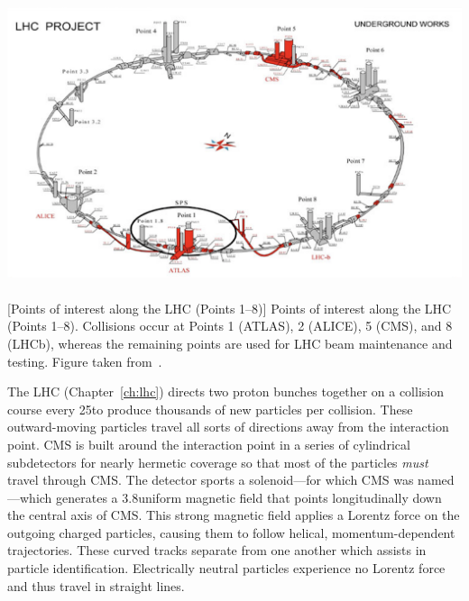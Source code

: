 \begin{multiFigure}
    \centering
    \includegraphics[height=9cm,keepaspectratio]{figures/cms/lhc_points_with_buildings.png}
        [Points of interest along the LHC (Points 1--8)]
        {Points of interest along the LHC (Points 1--8).
        Collisions occur at Points 1 (ATLAS), 2 (ALICE), 5 (CMS), and 8 (LHCb), whereas the remaining points are used for LHC beam maintenance and testing.
        Figure taken from~\cite{PhysRevLett.114.191803}. %
        } 
    \label{fig:lhc_points}
\end{multiFigure}

The LHC (Chapter~\ref{ch:lhc}) directs two proton bunches together on a collision course every 25\ns to produce thousands of new particles per \pp collision.
These outward-moving particles travel all sorts of directions away from the interaction point.
CMS is built around the interaction point in a series of cylindrical subdetectors for nearly hermetic coverage so that most of the particles \emph{must} travel through CMS.
The detector sports a solenoid---for which CMS was named---which generates a 3.8\tesla uniform magnetic field that points longitudinally down the central axis of CMS.
This strong magnetic field applies a Lorentz force on the outgoing charged particles, causing them to follow helical, momentum-dependent trajectories.
These curved tracks separate from one another which assists in particle identification.
Electrically neutral particles experience no Lorentz force and thus travel in straight lines.

